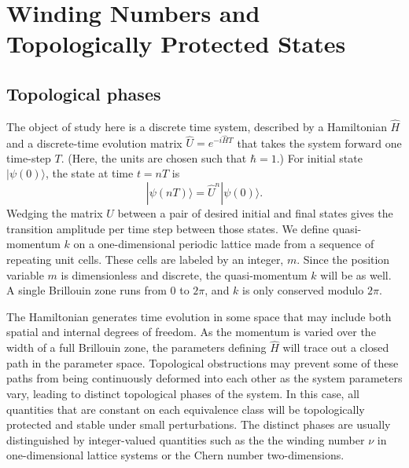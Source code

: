 \documentclass[twocolumn,amsmath, amssymb, superscriptaddress, pra]{revtex4}
\begin{document}

\section{Winding Numbers and Topologically Protected States}\label{topsection}

\subsection{Topological phases}
The object of study here is a discrete time system, described by a Hamiltonian $\hat H$ and a discrete-time evolution matrix $\hat U =e^{-i\hat HT}$ that takes
the system forward one time-step $T$. (Here, the units are chosen such that $\hbar=1$.) For initial state $|\psi(0)\rangle$, the state at time $t=nT$ is
\begin{equation}|\psi(nT)\rangle =\hat U^n |\psi(0)\rangle .\end{equation} Wedging the matrix $\hat U$ between a pair of desired initial and final states gives the
transition amplitude per time step between those states. We define quasi-momentum $k$ on a one-dimensional periodic lattice made from a sequence of repeating
unit cells. These cells are labeled by an integer, $m$. Since the position variable $m$ is dimensionless and discrete, the quasi-momentum $k$ will be as well. A
single Brillouin zone runs from $0$ to $2\pi$, and $k$ is only conserved modulo $2\pi$.

The Hamiltonian generates time evolution in some space that may include both
spatial and internal degrees of freedom.   As the momentum is varied over the
width of a full Brillouin zone, the parameters defining $\hat H$ will trace
out a closed path in the parameter space. Topological obstructions may
prevent some of these paths from being continuously deformed into each other
as the system parameters vary, leading to distinct topological phases of the
system. In this case, all quantities that are constant on each equivalence
class will be topologically protected and stable under small perturbations.
The distinct phases are usually distinguished by integer-valued quantities
such as the the winding number $\nu$ in one-dimensional lattice systems or
the Chern number two-dimensions.
\end{document}
